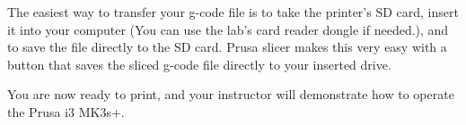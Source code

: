 \noindent The easiest way to transfer your g-code file is to take the printer's SD card, insert it into your computer (You can use the lab's card reader dongle if needed.), and to save the file directly to the SD card. Prusa slicer makes this very easy with a button that saves the sliced g-code file directly to your inserted drive.

\noindent You are now ready to print, and your instructor will demonstrate how to operate the Prusa i3 MK3s+.






